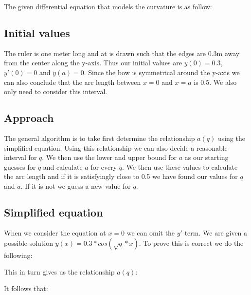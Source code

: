 The given differential equation that models the curvature is as follow:

\begin{center}
    
\end{center}

\subsection{Initial values}
The ruler is one meter long and at is drawn such that the edges are 0.3m away from the center along the y-axis. Thus our initial values are $y(0)=0.3$, $y'(0)=0$ and $y(a)=0$. Since the bow is symmetrical around the y-axis we can also conclude that the arc length between $x=0$ and $x=a$ is $0.5$. We also only need to consider this interval. 

\subsection{Approach}
The general algorithm is to take first determine the relationship $a(q)$ using the simplified equation. Using this relationship we can also decide a reasonable interval for $q$. We then use the lower and upper bound for $a$ as our starting guesses for $q$ and calculate $a$ for every $q$. We then use these values to calculate the arc length and if it is satisfyingly close to 0.5 we have found our values for $q$ and $a$. If it is not we guess a new value for $q$.

\subsection{Simplified equation}
When we consider the equation at $x=0$ we can omit the $y'$ term. We are given a possible solution $y(x)=0.3*cos(\sqrt{q}*x)$. To prove this is correct we do the following:

\begin{center}
        
\end{center}

This in turn gives us the relationship $a(q)$:

\begin{center}
    
\end{center}

It follows that:

\begin{center}
    
\end{center}

